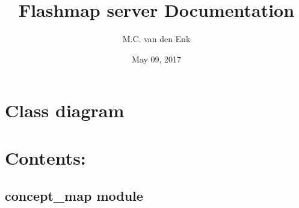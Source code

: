 \documentclass[letterpaper,10pt,english]{sphinxmanual}
\title{Flashmap server Documentation}
\date{May 09, 2017}
\author{M.C. van den Enk}
\begin{document}
\maketitle
\sphinxtableofcontents
{}\label{\detokenize{index::doc}}



\chapter{Class diagram}
\label{\detokenize{index:class-diagram}}\label{\detokenize{index:documentation-of-the-flashmap-experiment-software}}
\noindent{}


\chapter{Contents:}
\label{\detokenize{index:contents}}

\section{concept\_map module}
\label{\detokenize{concept_map::doc}}\label{\detokenize{concept_map:module-concept_map}}\label{\detokenize{concept_map:concept-map-module}}
\end{document}
